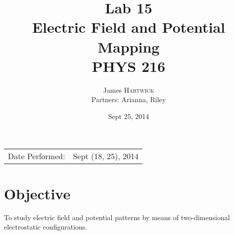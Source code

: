 \documentclass{article}
\title{Lab 15 \\ Electric Field and Potential Mapping \\ PHYS 216} %
\author{James \textsc{Hartwick}\\Partners: Arianna, Riley} %
\date{Sept 25, 2014} %
\begin{document}
\maketitle %

\begin{center}
\begin{tabular}{l r}
Date Performed: & Sept (18, 25), 2014 \\ %
\end{tabular}
\end{center}



\section{Objective}

To study electric field and potential patterns by means of two-dimensional electrostatic configurations.



\end{document}
